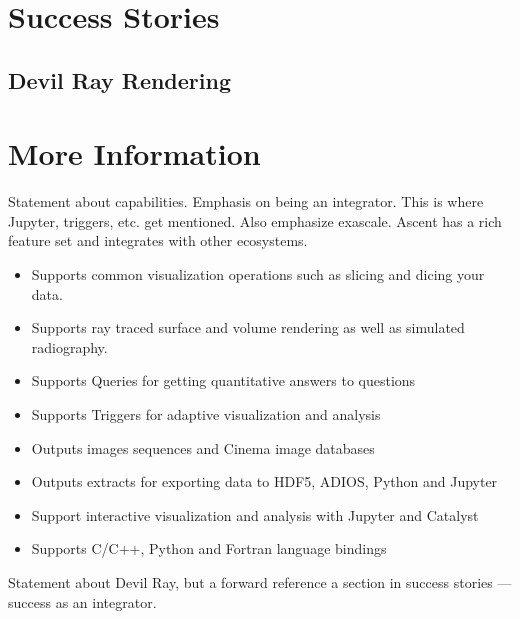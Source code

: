\documentclass[graybox]{svmult}
\newcommand{\fix}[1]{\textcolor{red}{#1}} %
\begin{document}
\section{Success Stories}
\label{sec:success}


\subsection{Devil Ray Rendering}
\label{sec:DevilRay}


\section{More Information}
\label{sec:information}



Statement about capabilities.  Emphasis on being an integrator.
This is where Jupyter, triggers, etc. get mentioned.  Also emphasize
exascale.
Ascent has a rich feature set and integrates with other ecosystems.

\begin{itemize}
  \item Supports common visualization operations such as slicing and dicing your data.
  \item Supports ray traced surface and volume rendering as well as simulated radiography.
  \item Supports Queries for getting quantitative answers to questions
  \item Supports Triggers for adaptive visualization and analysis
  \item Outputs images sequences and Cinema image databases
  \item Outputs extracts for exporting data to HDF5, ADIOS, Python and Jupyter
  \item Support interactive visualization and analysis with Jupyter and Catalyst
  \item Supports C/C++, Python and Fortran language bindings
\end{itemize}

Statement about Devil Ray, but a forward reference a section in success stories --- success as an integrator.
\fi


\end{document}
